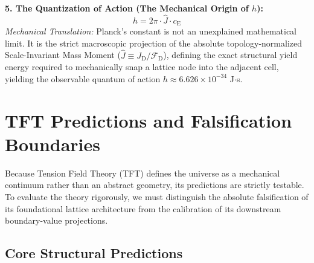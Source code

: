 \vspace{0.5em}
\noindent \textbf{5. The Quantization of Action (The Mechanical Origin of $h$):}
\begin{equation}
    h = 2\pi \cdot \hat{J} \cdot c_{\mathrm{E}}
\end{equation}
\textit{Mechanical Translation:} Planck's constant is not an unexplained mathematical limit. It is the strict macroscopic projection of the absolute topology-normalized Scale-Invariant Mass Moment ($\hat{J} \equiv J_{\mathrm{D}} / \mathcal{F}_{\mathrm{D}}$), defining the exact structural yield energy required to mechanically snap a lattice node into the adjacent cell, yielding the observable quantum of action $h \approx 6.626 \times 10^{-34}$ J$\cdot$s.

\section{TFT Predictions and Falsification Boundaries}
\label{sec:tft_predictions_partI}

Because Tension Field Theory (TFT) defines the universe as a mechanical continuum rather than an abstract geometry, its predictions are strictly testable. To evaluate the theory rigorously, we must distinguish the absolute falsification of its foundational lattice architecture from the calibration of its downstream boundary-value projections.

\subsection*{Core Structural Predictions}

